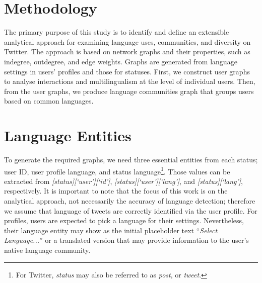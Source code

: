 \documentclass{llncs}
\begin{document}
\section{Methodology}\label{methodology}

The primary purpose of this study is to identify and define an
extensible analytical approach for examining language uses,
communities, and diversity on Twitter. The approach is based on
network graphs and their properties, such as indegree, outdegree, and
edge weights. Graphs are generated from language settings in users'
profiles and those for statuses.  First, we construct user graphs to
analyse interactions and multilingualism at the level of individual
users. Then, from the user graphs, we produce language communities
graph that groups users based on common languages.

\section{Language Entities}

To generate the required graphs, we need three essential entities from
each status; user ID, user profile language, and status
language\footnote{For Twitter, \emph{status} may also be referred to
as \emph{post}, or \emph{tweet}.}.  Those values can be extracted from
{\emph{[status][`user'][`id']}}, {\emph{[status][`user'][`lang']}},
and {\emph{[status][`lang']}}, respectively. It is important to note
that the focus of this work is on the analytical approach, not
necessarily the accuracy of language detection; therefore we assume
that language of tweets are correctly identified via the user profile.
For profiles, users are expected to pick a language for their
settings. Nevertheless, their language entity may show as the initial
placeholder text ``\emph{Select Language...}'' or a translated version
that may provide information to the user's native language community.

\end{document}
